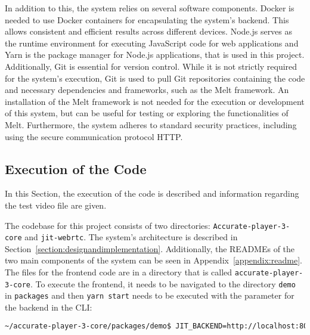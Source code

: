 \documentclass[../MasterThesis.tex]{subfiles}
\begin{document}
In addition to this, the system relies on several software components.
Docker is needed to use Docker containers for encapsulating the system's backend. This allows consistent and efficient results across different devices.
Node.js serves as the runtime environment for executing JavaScript code for web applications and Yarn is the package manager for Node.js applications, that is used in this project.
Additionally, Git is essential for version control. While it is not strictly required for the system's execution, Git is used to pull Git repositories containing the code and necessary dependencies and frameworks, such as the Melt framework. 
An installation of the Melt framework is not needed for the execution or development of this system, but can be useful for testing or exploring the functionalities of Melt.
%
Furthermore, the system adheres to standard security practices, including using the secure communication protocol HTTP.


	
	
	
	
	
	








\subsection{Execution of the Code} \label{subsection:runninghtecode}

In this Section, the execution of the code is described and information regarding the test video file are given.

The codebase for this project consists of two directories: \texttt{Accurate-player-3-core} and \texttt{jit-webrtc}. The system's architecture is described in Section~\ref{section:designandimplementation}. Additionally, the READMEs of the two main components of the system can be seen in Appendix~\ref{appendix:readme}.
%
The files for the frontend code are in a directory that is called \texttt{accurate-player-3-core}. To execute the frontend, it needs to be navigated to the directory \texttt{demo} in \texttt{packages} and then \texttt{yarn start} needs to be executed with the parameter for the backend in the CLI:
\begin{lstlisting}[language=bash, numbers=none, columns=fullflexible]
	~/accurate-player-3-core/packages/demo$ JIT_BACKEND=http://localhost:8080 yarn start
\end{lstlisting}
\end{document}
